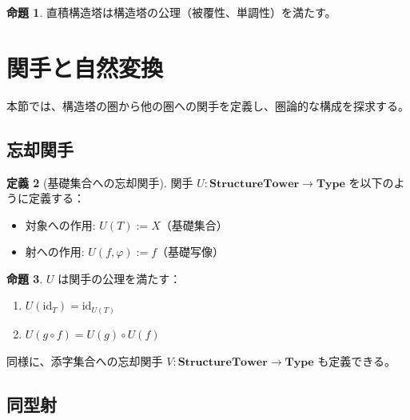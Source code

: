 \documentclass[a4paper,12pt]{ltjsarticle}
\theoremstyle{definition}
\newtheorem{definition}{定義}[section]
\newtheorem{proposition}[definition]{命題}
\begin{document}
\begin{proposition}
直積構造塔は構造塔の公理（被覆性、単調性）を満たす。
\end{proposition}

\section{関手と自然変換}
\label{sec:cat2-advanced}

本節では、構造塔の圏から他の圏への関手を定義し、圏論的な構成を探求する。

\subsection{忘却関手}

\begin{definition}[基礎集合への忘却関手]
\label{def:forget-carrier}
関手 $U: \mathbf{StructureTower} \to \mathbf{Type}$ を以下のように定義する：
\begin{itemize}
\item 対象への作用: $U(T) := X$（基礎集合）
\item 射への作用: $U(f, \varphi) := f$（基礎写像）
\end{itemize}
\end{definition}

\begin{proposition}
$U$ は関手の公理を満たす：
\begin{enumerate}
\item $U(\mathrm{id}_T) = \mathrm{id}_{U(T)}$
\item $U(g \circ f) = U(g) \circ U(f)$
\end{enumerate}
\end{proposition}

同様に、添字集合への忘却関手 $V: \mathbf{StructureTower} \to \mathbf{Type}$ も定義できる。

\subsection{同型射}
\end{document}
